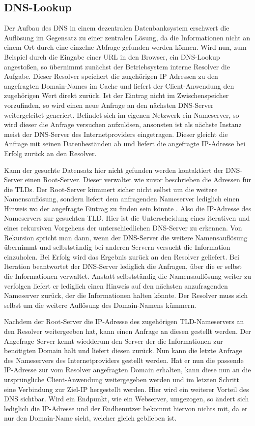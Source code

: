\subsection{DNS-Lookup}
Der Aufbau des DNS in einem dezentralen Datenbanksystem erschwert die Auflösung im Gegensatz zu einer zentralen Lösung, da die Informationen nicht an einem Ort durch eine einzelne Abfrage gefunden werden können. Wird nun, zum Beispiel durch die Eingabe einer URL in den Browser, ein DNS-Lookup angestoßen, so übernimmt zunächst der Betriebsystem interne Resolver die Aufgabe. Dieser Resolver speichert die zugehörigen IP Adressen zu den angefragten Domain-Names im Cache und liefert der Client-Anwendung den zugehörigen Wert direkt zurück.  Ist der Eintrag nicht im Zwischenspeicher vorzufinden, so wird einen neue Anfrage  an den nächsten DNS-Server weitergeleitet generiert. Befindet sich im eigenen Netzwerk ein Nameserver, so wird dieser die Anfrage versuchen aufzulösen, ansonsten ist als nächste Instanz meist der DNS-Server des Internetproviders eingetragen. Dieser gleicht die Anfrage mit seinen Datenbeständen ab und liefert die angefragte IP-Adresse bei Erfolg zurück an den Resolver. \cite{1und1.22.01.2018}

Kann der gesuchte Datensatz hier nicht gefunden werden kontaktiert der DNS-Server einen Root-Server. Dieser verwaltet wie zuvor beschrieben die Adressen für die TLDs. Der Root-Server kümmert sicher nicht selbst um die weitere Namensauflösung, sondern liefert dem anfragenden Nameserver lediglich einen Hinweis wo der angefragte Eintrag zu finden sein könnte \cite{Schreiner.2016}. Also die IP-Adresse des Nameservers zur gesuchten TLD. Hier ist die Unterscheidung eines iterativen und eines rekursiven Vorgehens der unterschiedlichen DNS-Server zu erkennen. Von Rekursion spricht man dann, wenn der DNS-Server die weitere Namensauflösung übernimmt und selbstständig bei anderen Servern versucht die Information einzuholen. Bei Erfolg wird das Ergebnis zurück an den Resolver geliefert. Bei Iteration beantwortet der DNS-Server lediglich die Anfragen, über die er selbst die Informationen verwaltet. Anstatt selbstständig die Namensauflösung weiter zu verfolgen liefert er lediglich einen Hinweis auf den nächsten anzufragenden Nameserver zurück, der die Informationen halten könnte. Der Resolver muss sich selbst um die weitere Auflösung des Domain-Namens kümmern. \cite{1und1.22.01.2018}

Nachdem der Root-Server die IP-Adresse des zugehörigen TLD-Nameservers an den Resolver weitergeeben hat, kann einen Anfrage an diesen gestellt werden. Der Angefrage Server kennt wiedderum den Server der die Informationen zur benötigten Domain hält und liefert diesen zurück. Nun kann die letzte Anfrage des Nameservers des Internetproviders gestellt werden. Hat er nun die passende IP-Adresse zur vom Resolver angefragten Domain erhalten, kann diese nun an die ursprüngliche Client-Anwendung weitergegeben werden und im letzten Schritt eine Verbindung zur Ziel-IP hergestellt werden. Hier wird ein weiterer Vorteil des DNS sichtbar. Wird ein Endpunkt, wie ein Webserver, umgezogen, so ändert sich lediglich die IP-Adresse und der Endbenutzer bekommt hiervon nichts mit, da er nur den Domain-Name sieht, welcher gleich geblieben ist. \cite{Schreiner.2016}

